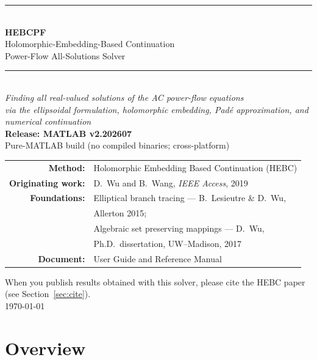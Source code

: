 \documentclass[11pt,a4paper]{article}
\begin{document}
\begin{titlepage}
\centering
\vspace*{2.2cm}
{\color{rule}\rule{\textwidth}{1.2pt}}\\[8pt]
{\Huge\bfseries HEBCPF}\\[10pt]
{\LARGE Holomorphic-Embedding-Based Continuation}\\[4pt]
{\LARGE Power-Flow All-Solutions Solver}\\[10pt]
{\color{rule}\rule{\textwidth}{1.2pt}}\\[18pt]
{\large\itshape Finding \emph{all} real-valued solutions of the AC power-flow equations}\\[6pt]
{\large\itshape via the ellipsoidal formulation, holomorphic embedding, Pad\'e approximation, and numerical continuation}\\[26pt]

{\large\bfseries Release: MATLAB v2.202607}\\[4pt]
{\large Pure-MATLAB build (no compiled binaries; cross-platform)}\\[30pt]

\begin{tabular}{rl}
\textbf{Method:} & Holomorphic Embedding Based Continuation (HEBC)\\[3pt]
\textbf{Originating work:} & D.\ Wu and B.\ Wang, \emph{IEEE Access}, 2019\\[6pt]
\textbf{Foundations:} & Elliptical branch tracing --- B.\ Lesieutre \& D.\ Wu,\\[1pt]
                      & Allerton 2015;\\[3pt]
                      & Algebraic set preserving mappings --- D.\ Wu,\\[1pt]
                      & Ph.D.\ dissertation, UW--Madison, 2017\\[6pt]
\textbf{Document:} & User Guide and Reference Manual\\
\end{tabular}

\vfill
{\small When you publish results obtained with this solver, please cite the HEBC
paper (see Section~\ref{sec:cite}).}\\[6pt]
{\small\today}
\end{titlepage}

\tableofcontents
\newpage

\section{Overview}
\end{document}
